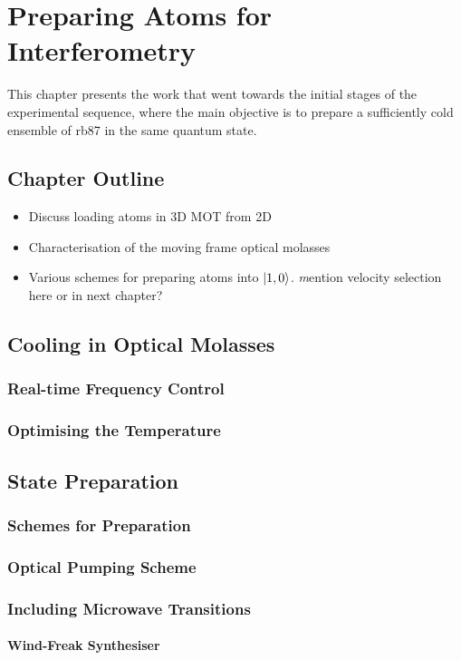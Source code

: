 \chapter{Preparing Atoms for Interferometry}\label{chap:atom_prep}
This chapter presents the work that went towards the initial stages of the experimental sequence, where the main objective is to prepare a sufficiently cold ensemble of \ac{rb87} in the same quantum state.
\section{Chapter Outline}
\begin{itemize}
    \item Discuss loading atoms in 3D MOT from 2D
    \item Characterisation of the moving frame optical molasses
    \item Various schemes for preparing atoms into \(\ket{1,0}\). {\textit mention velocity selection here or in next chapter?}
\end{itemize}

\section{Cooling in Optical Molasses}
\subsection{Real-time Frequency Control}
\subsection{Optimising the Temperature}

\section{State Preparation}\label{sec:state_prep}
\subsection{Schemes for Preparation}
\subsection{Optical Pumping Scheme} 
\subsection{Including Microwave Transitions}
\subsubsection{Wind-Freak Synthesiser}\label{subsec:windfreak}